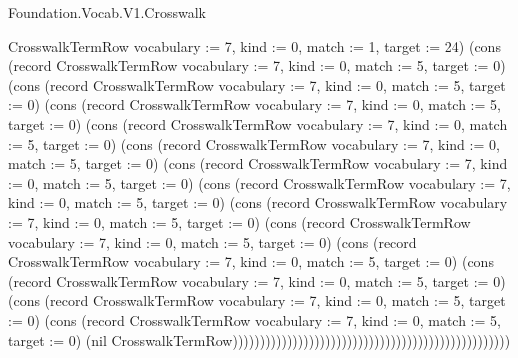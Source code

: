 \begin{lexlean}{Foundation.Vocab.V1.Crosswalk}
\begin{semanticmodule}
{CrosswalkTermRow {vocabulary := 7, kind := 0, match := 1, target := 24}) (cons (record CrosswalkTermRow {vocabulary := 7, kind := 0, match := 5, target := 0}) (cons (record CrosswalkTermRow {vocabulary := 7, kind := 0, match := 5, target := 0}) (cons (record CrosswalkTermRow {vocabulary := 7, kind := 0, match := 5, target := 0}) (cons (record CrosswalkTermRow {vocabulary := 7, kind := 0, match := 5, target := 0}) (cons (record CrosswalkTermRow {vocabulary := 7, kind := 0, match := 5, target := 0}) (cons (record CrosswalkTermRow {vocabulary := 7, kind := 0, match := 5, target := 0}) (cons (record CrosswalkTermRow {vocabulary := 7, kind := 0, match := 5, target := 0}) (cons (record CrosswalkTermRow {vocabulary := 7, kind := 0, match := 5, target := 0}) (cons (record CrosswalkTermRow {vocabulary := 7, kind := 0, match := 5, target := 0}) (cons (record CrosswalkTermRow {vocabulary := 7, kind := 0, match := 5, target := 0}) (cons (record CrosswalkTermRow {vocabulary := 7, kind := 0, match := 5, target := 0}) (cons (record CrosswalkTermRow {vocabulary := 7, kind := 0, match := 5, target := 0}) (cons (record CrosswalkTermRow {vocabulary := 7, kind := 0, match := 5, target := 0}) (nil CrosswalkTermRow)))))))))))))))))))))))))))))))))))))))))))))))))))
}


\end{semanticmodule}
\end{lexlean}
